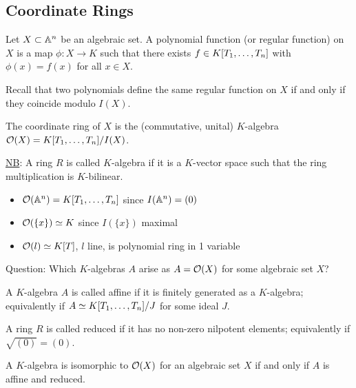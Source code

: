 \documentclass[a4paper,11pt]{article}
\begin{document}
		\subsection{Coordinate Rings}

			\begin{defi}
				Let $X\subset\AA^n$ be an algebraic set. A polynomial function (or regular function) on $X$ is a map $\phi:X\rightarrow K$ such that there exists $f\in\K$ with $\phi(x)=f(x)$ for all $x\in X$.
			\end{defi}

			\begin{remark}
				Recall that two polynomials define the same regular function on $X$ if and only if they coincide modulo $I(X)$. 
			\end{remark}

			\begin{defi}
				The coordinate ring of $X$ is the (commutative, unital) $K$-algebra $\O(X)=\K/I(X)$.
			\end{defi}

			\noindent\underline{NB}: A ring $R$ is called $K$-algebra if it is a $K$-vector space such that the ring multiplication is $K$-bilinear.

			\begin{eg}
				\begin{itemize}
					\item $\O(\AA^n)=\K$ since $I(\AA^n)=(0)$
					\item $\O(\{x\})\simeq K$ since $I(\{x\})$ maximal
					\item $\O(l)\simeq K[T]$, $l$ line, is polynomial ring in 1 variable
				\end{itemize}
			\end{eg}	

			Question: Which $K$-algebras $A$ arise as $A=\O(X)$ for some algebraic set $X$?

			\begin{defi}
				A $K$-algebra $A$ is called affine if it is finitely generated as a $K$-algebra; equivalently if $A\simeq\K/J$ for some ideal $J$.
			\end{defi}

			\begin{defi}
				A ring $R$ is called reduced if it has no non-zero nilpotent elements; equivalently if $\sqrt{(0)}=(0)$.
			\end{defi}

			\begin{prop}
				A $K$-algebra is isomorphic to $\O(X)$ for an algebraic set $X$ if and only if $A$ is affine and reduced.
			\end{prop}
\end{document}
